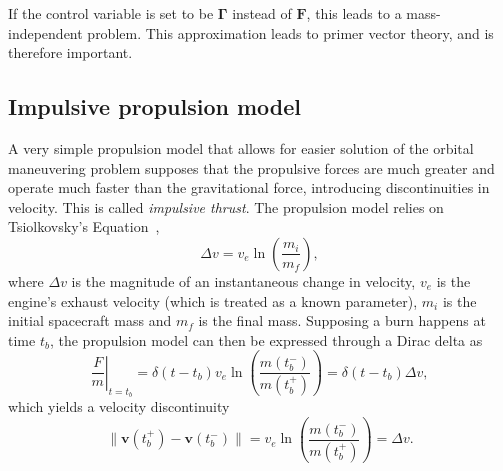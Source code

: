If the control variable is set to be \(\mathbf{\Gamma}\) instead of \(\mathbf{F}\), this leads to a mass-independent problem. This approximation leads to primer vector theory, and is therefore important. 


\subsection{Impulsive propulsion model}\label{sec:imp_prop_model}


A very simple propulsion model that allows for easier solution of the orbital maneuvering problem supposes that the propulsive forces are much greater and operate much faster than the gravitational force, introducing discontinuities in velocity. This is called \textit{impulsive thrust}. The propulsion model relies on Tsiolkovsky's Equation~\cite{Conway_2010}, 
\begin{equation}
    \Delta v = v_e \ln{\left(\frac{m_i}{m_f}\right)},
\end{equation}
where \(\Delta v\) is the magnitude of an instantaneous change in velocity, \(v_e\) is the engine's exhaust velocity (which is treated as a known parameter), \(m_i\) is the initial spacecraft mass and \(m_f\) is the final mass. Supposing a burn happens at time \(t_b\), the propulsion model can then be expressed through a Dirac delta as
\begin{equation}
    \left.\frac{F}{m}\right\vert_{t = t_b} = \delta(t - t_b) v_e \ln{\left(\frac{m(t_b^-)}{m(t_b^+)} \right)} = \delta(t - t_b) \Delta v,
\end{equation}
which yields a velocity discontinuity
\begin{equation}
    \lVert \mathbf{v}(t_b^+) - \mathbf{v}(t_b^-) \rVert = v_e \ln{\left(\frac{m(t_b^-)}{m(t_b^+)}\right)} = \Delta v.
\end{equation}

